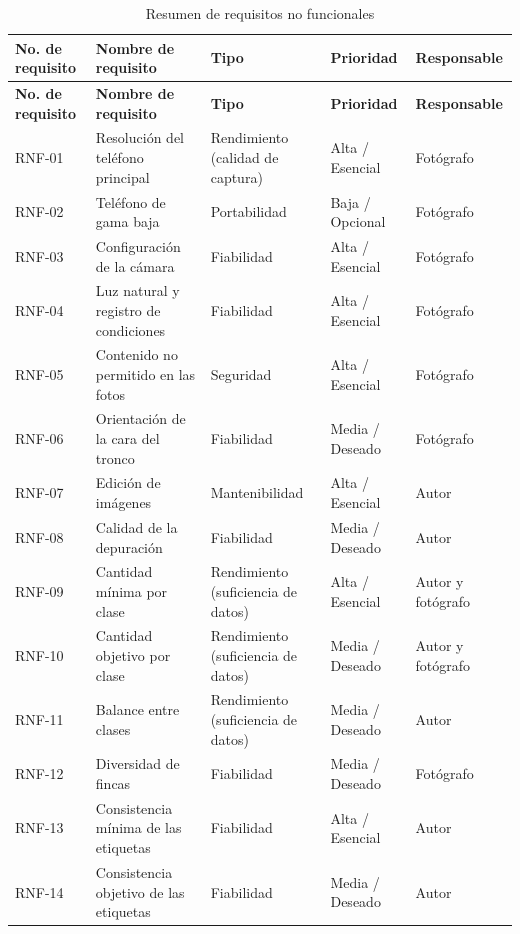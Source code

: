 \documentclass[11pt]{article}
\begin{document}
{\small
\begin{longtable}{|>{\RaggedRight\arraybackslash}p{2.04cm}|>{\RaggedRight\arraybackslash}p{4.09cm}|>{\RaggedRight\arraybackslash}p{2.97cm}|>{\RaggedRight\arraybackslash}p{2.42cm}|>{\RaggedRight\arraybackslash}p{2.6cm}|}
\caption{Resumen de requisitos no funcionales}\\
\hline
\rowcolor{encabezado}\textbf{No. de requisito} & \textbf{Nombre de requisito} & \textbf{Tipo} & \textbf{Prioridad} & \textbf{Responsable} \\ \hline
\endfirsthead
\hline
\rowcolor{encabezado}\textbf{No. de requisito} & \textbf{Nombre de requisito} & \textbf{Tipo} & \textbf{Prioridad} & \textbf{Responsable} \\ \hline
\endhead
RNF-01 & Resolución del teléfono principal & Rendimiento (calidad de captura) & Alta / Esencial & Fotógrafo \\ \hline
RNF-02 & Teléfono de gama baja & Portabilidad & Baja / Opcional & Fotógrafo \\ \hline
RNF-03 & Configuración de la cámara & Fiabilidad & Alta / Esencial & Fotógrafo \\ \hline
RNF-04 & Luz natural y registro de condiciones & Fiabilidad & Alta / Esencial & Fotógrafo \\ \hline
RNF-05 & Contenido no permitido en las fotos & Seguridad & Alta / Esencial & Fotógrafo \\ \hline
RNF-06 & Orientación de la cara del tronco & Fiabilidad & Media / Deseado & Fotógrafo \\ \hline
RNF-07 & Edición de imágenes & Mantenibilidad & Alta / Esencial & Autor \\ \hline
RNF-08 & Calidad de la depuración & Fiabilidad & Media / Deseado & Autor \\ \hline
RNF-09 & Cantidad mínima por clase & Rendimiento (suficiencia de datos) & Alta / Esencial & Autor y fotógrafo \\ \hline
RNF-10 & Cantidad objetivo por clase & Rendimiento (suficiencia de datos) & Media / Deseado & Autor y fotógrafo \\ \hline
RNF-11 & Balance entre clases & Rendimiento (suficiencia de datos) & Media / Deseado & Autor \\ \hline
RNF-12 & Diversidad de fincas & Fiabilidad & Media / Deseado & Fotógrafo \\ \hline
RNF-13 & Consistencia mínima de las etiquetas & Fiabilidad & Alta / Esencial & Autor \\ \hline
RNF-14 & Consistencia objetivo de las etiquetas & Fiabilidad & Media / Deseado & Autor \\ \hline

\end{longtable}}
\end{document}
